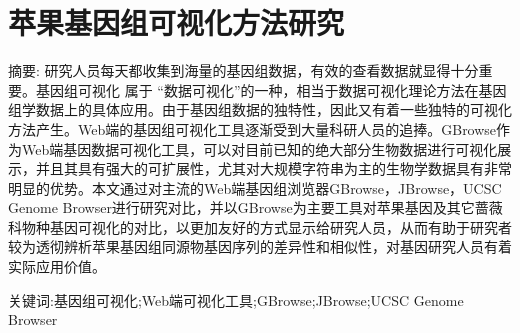 \chapter*{苹果基因组可视化方法研究}

\vspace{1em}
{\large {\heiti 摘要: }}\normalsize{\songti 
研究人员每天都收集到海量的基因组数据，有效的查看数据就显得十分重要。基因组可视化 属于 “数据可视化”的一种，相当于数据可视化理论方法在基因组学数据上的具体应用。由于基因组数据的独特性，因此又有着一些独特的可视化方法产生。Web端的基因组可视化工具逐渐受到大量科研人员的追捧。GBrowse作为Web端基因数据可视化工具，可以对目前已知的绝大部分生物数据进行可视化展示，并且其具有强大的可扩展性，尤其对大规模字符串为主的生物学数据具有非常明显的优势。本文通过对主流的Web端基因组浏览器GBrowse，JBrowse，UCSC Genome Browser进行研究对比，并以GBrowse为主要工具对苹果基因及其它蔷薇科物种基因可视化的对比，以更加友好的方式显示给研究人员，从而有助于研究者较为透彻辨析苹果基因组同源物基因序列的差异性和相似性，对基因研究人员有着实际应用价值。
}

{\large {\heiti 关键词:}}\normalsize{基因组可视化;Web端可视化工具;GBrowse;JBrowse;UCSC Genome Browser}
\thispagestyle{empty}